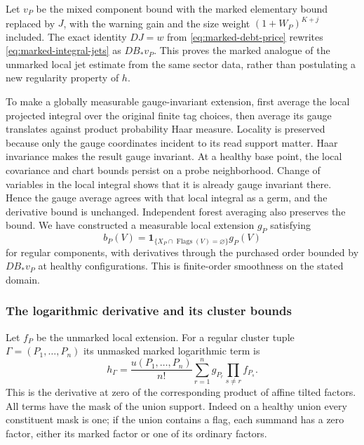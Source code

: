 Let $v_P$ be the mixed component bound with the marked elementary
bound replaced by $J$, with the warning gain and the size weight
$(1+W_P)^{K+j}$ included. The exact identity $DJ=w$ from
\eqref{eq:marked-debt-price} rewrites
\eqref{eq:marked-integral-jets} as $D B_*v_P$.
This proves the marked analogue of the unmarked local jet estimate
from the same sector data, rather than postulating a new regularity
property of $h$.

To make a globally measurable gauge-invariant extension, first
average the local projected integral over the original finite tag
choices, then average its gauge translates against product
probability Haar measure. Locality is preserved because only the
gauge coordinates incident to its read support matter. Haar
invariance makes the result gauge invariant. At a healthy base
point, the local covariance and chart bounds persist on a probe
neighborhood. Change of variables in the local integral shows
that it is already gauge invariant there. Hence the gauge average
agrees with that local integral as a germ, and the derivative bound
is unchanged. Independent forest averaging also preserves the bound.
We have constructed a measurable local extension $g_P$ satisfying
\[
 b_P(V)=\mathbf1_{\{X_P\cap\operatorname{Flags}(V)=\varnothing\}}
                                  g_P(V)
\]
for regular components, with derivatives through the purchased
order bounded by $D B_*v_P$ at healthy configurations. This is
finite-order smoothness on the stated domain.

\subsubsection{The logarithmic derivative and its cluster bounds}
Let $f_P$ be the unmarked local extension. For a regular cluster
tuple $\Gamma=(P_1,\ldots,P_n)$ its unmasked marked logarithmic
term is
\begin{equation}\label{eq:marked-local-log-term}
 h_\Gamma=\frac{u(P_1,\ldots,P_n)}{n!}
       \sum_{r=1}^n g_{P_r}\prod_{s\ne r}f_{P_s}.
\end{equation}
This is the derivative at zero of the corresponding product of
affine tilted factors. All terms have the mask of the union
support. Indeed on a healthy union every constituent mask is one;
if the union contains a flag, each summand has a zero factor,
either its marked factor or one of its ordinary factors.

